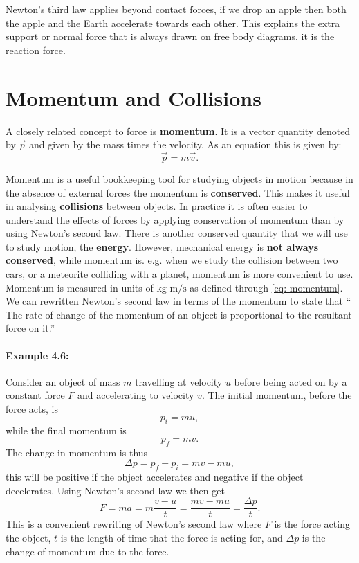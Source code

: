 \documentclass[a4paper,12pt]{book}
\begin{document}
Newton's third law applies beyond contact forces, if we drop an apple then both the apple and the Earth accelerate towards each other. This explains the extra support or normal force that is always drawn on free body diagrams, it is the reaction force.\\


\section{Momentum and Collisions}
A closely related concept to force is \textbf{momentum}. It is a vector quantity denoted by $\vec{p}$ and given by the mass times the velocity. As an equation this is given by:
\begin{equation*}
\vec{p}=m\vec{v}.
\label{eq: momentum}
\end{equation*}

Momentum is a useful bookkeeping tool for studying objects in motion because in the absence of external forces the momentum is \textbf{conserved}. This makes it useful in analysing \textbf{collisions} between objects. In practice it is often easier to understand the effects of forces by applying conservation of momentum than by using Newton's second law. There is another conserved quantity that we will use to study motion, the \textbf{energy}. However, mechanical energy is \textbf{not always conserved}, while momentum is. e.g. when we study the collision between two cars, or a meteorite colliding with a planet, momentum is more convenient to use.\\

Momentum is measured in units of $\text{kg m/s}$ as defined through \cref{eq: momentum}.  We can rewritten Newton's second law in terms of the momentum to state that `` The rate of change of the momentum of an object is proportional to the resultant force on it.''

\paragraph{Example 4.6:} Consider an object of mass $m$ travelling at velocity $u$ before being acted on by a constant force $F$ and accelerating to velocity $v$. The initial momentum, before the force acts, is
\begin{equation*}
p_{i}=mu,
\end{equation*}
while the final momentum is 
\begin{equation*}
p_{f}=mv.
\end{equation*}
The change in momentum is thus
\begin{equation*}
\Delta p=p_{f}-p_{i}=mv-mu,
\end{equation*}
this will be positive if the object accelerates and negative if the object decelerates. Using Newton's second law we then get
\begin{equation*}
F=ma=m\frac{v-u}{t}=\frac{mv-mu}{t}=\frac{\Delta p}{t}.
\end{equation*}
This is a convenient rewriting of Newton's second law where $F$ is the force acting the object, $t$ is the length of time that the force is acting for, and $\Delta p$ is the change of momentum due to the force.
\end{document}
